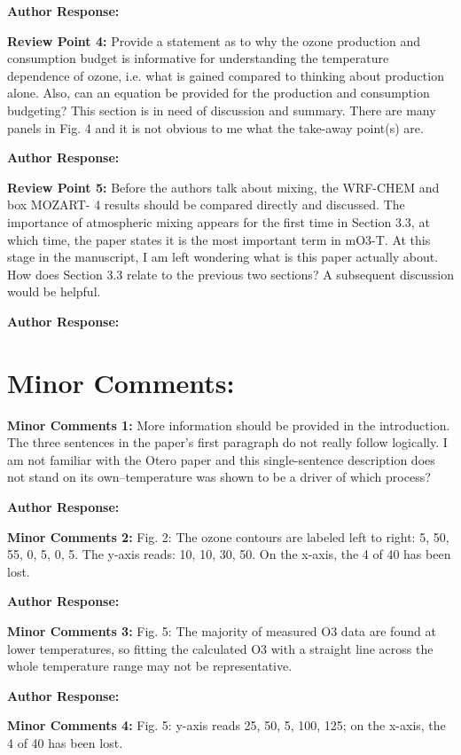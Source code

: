 \documentclass{article}
\begin{document}
\textbf{Author Response:}

\textbf{Review Point 4:}  Provide a statement as to why the ozone production and consumption budget is informative for understanding the temperature dependence of ozone, i.e.  what is gained compared to thinking about production alone. Also, can an equation be provided for the production and consumption budgeting? This section is in need of discussion and summary. There are many panels in Fig. 4 and it is not obvious to me what the take-away point(s) are.

\textbf{Author Response:}

\textbf{Review Point 5:} Before the authors talk about mixing, the WRF-CHEM and box MOZART- 4 results should be compared directly and discussed. The importance of atmospheric mixing appears for the first time in Section 3.3, at which time, the paper states it is the most important term in mO3-T. At this stage in the manuscript, I am left wondering what is this paper actually about. How does Section 3.3 relate to the previous two sections?  A subsequent discussion would be helpful.

\textbf{Author Response:} 

\section*{Minor Comments:}
\textbf{Minor Comments 1:}  More information should be provided in the introduction. The three sentences in the paper’s first paragraph do not really follow logically. I am not familiar with the Otero paper and this single-sentence description does not stand on its own–temperature was shown to be a driver of which process?

\textbf{Author Response:} 

\textbf{Minor Comments 2:} Fig. 2: The ozone contours are labeled left to right: 5, 50, 55, 0, 5, 0, 5. The y-axis reads: 10, 10, 30, 50. On the x-axis, the 4 of 40 has been lost.

\textbf{Author Response:}

\textbf{Minor Comments 3:} Fig. 5: The majority of measured O3 data are found at lower temperatures, so fitting the calculated O3 with a straight line across the whole temperature range may not be representative.

\textbf{Author Response:}

\textbf{Minor Comments 4:} Fig. 5: y-axis reads 25, 50, 5, 100, 125; on the x-axis, the 4 of 40 has been lost.
\end{document}

